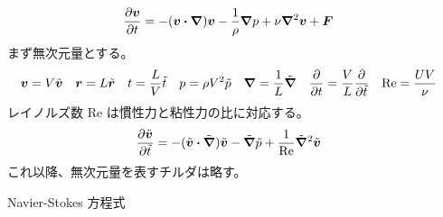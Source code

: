 \documentclass[uplatex,dvipdfmx,a4paper,11pt]{jlreq}
\theoremstyle{definition}
\begin{document}
\begin{definition}
  \begin{align}
    \pdv{\bm{v}}{t} & = -(\bm{v}\vdot\vnabla)\bm{v} - \frac{1}{\rho}\vnabla p + \nu\vnabla^2\bm{v} + \bm{F}
  \end{align}
  まず無次元量とする。
  \begin{align}
    \bm{v} & = V\tilde{\bm{v}} & \bm{r} & = L\tilde{\bm{r}} & t & = \frac{L}{V}\tilde{t} & p & = \rho V^2\tilde{p} & \vnabla & = \frac{1}{L}\tilde{\vnabla} & \pdv{t} & = \frac{V}{L}\pdv{\tilde{t}} & \mathrm{Re} & = \frac{UV}{\nu}
  \end{align}
  レイノルズ数 $\mathrm{Re}$ は慣性力と粘性力の比に対応する。
  \begin{align}
    \pdv{\tilde{\bm{v}}}{\tilde{t}} & = -(\tilde{\bm{v}}\vdot\tilde{\vnabla})\tilde{\bm{v}} - \tilde{\vnabla}\tilde{p} + \frac{1}{\mathrm{Re}}\tilde{\vnabla}^2\tilde{\bm{v}}
  \end{align}
  これ以降、無次元量を表すチルダは略す。
\end{definition}
\begin{theorem}
  Navier-Stokes 方程式
\end{theorem}
\end{document}
